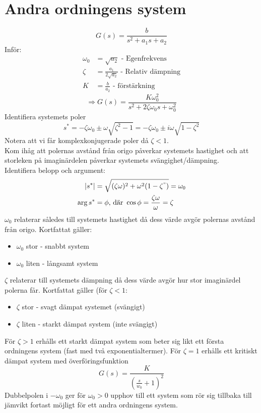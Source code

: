 \documentclass[12pt]{article}
\begin{document}
\section*{Andra ordningens system}

\begin{equation*}
  G(s) = \frac{b}{s^2 + a_1 s + a_2}
\end{equation*}
Inför: \\
\begin{align*}
  \omega_0 &= \sqrt{a_2} \text{ - Egenfrekvens} \\
  \zeta &= \frac{a_1}{2\sqrt{a_2}} \text{ - Relativ dämpning} \\
  K &= \frac{b}{a_2} \text{ - förstärkning}
\end{align*}
\begin{equation*}
  \Rightarrow G(s) = \frac{K\omega_0^2}{s^2 + 2\zeta \omega_0s + \omega_0^2}
\end{equation*}
Identifiera systemets poler
\begin{equation*}
  s^* = -\zeta\omega_0 \pm \omega\sqrt{\zeta^2-1} = -\zeta\omega_0 \pm i \omega\sqrt{1 - \zeta^2}
\end{equation*}
Notera att vi får komplexkonjugerade poler då $\zeta < 1$. \\
Kom ihåg att polernas avstånd från origo påverkar systemets hastighet och att storleken på imaginärdelen påverkar systemets svängighet/dämpning. \\

Identifiera belopp och argument: \\
\begin{align*}
|s^*| &= \sqrt{(\zeta\omega)^2 + \omega^2(1-\zeta^")} = \omega_0 \\
\arg{s^*} &= \phi \text{, där } \cos{\phi} = \frac{\zeta\omega}{\omega} = \zeta 
\end{align*}
$\omega_0$ relaterar således till systemets hastighet då dess värde avgör polernas avstånd från origo. Kortfattat gäller:
\begin{itemize}
\item $\omega_0$ stor - snabbt system
\item $\omega_0$ liten - långsamt system
\end{itemize}
$\zeta$ relaterar till systemets dämpning då dess värde avgör hur stor imaginärdel polerna får. Kortfattat gäller (för $\zeta < 1$:
\begin{itemize}
\item $\zeta$ stor - svagt dämpat systemet (svängigt)
\item $\zeta$ liten - starkt dämpat system (inte svängigt)
\end{itemize}
För $\zeta > 1$ erhålls ett starkt dämpat system som beter sig likt ett första ordningens system (fast med två exponentialtermer). För $\zeta = 1$ erhålls ett kritiskt dämpat system med överföringsfunktion
\[G(s) = \frac{K}{(\frac{s}{w_0} + 1)^2}\]
Dubbelpolen i $-\omega_0$ ger för $\omega_0 > 0$ upphov till ett system som rör sig tillbaka till jämvikt fortast möjligt för ett andra ordningens system.
\end{document}
